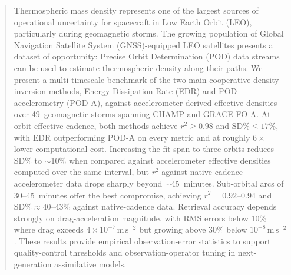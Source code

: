 \documentclass[draft]{agujournal2019}
\begin{document}
\begin{abstract}
Thermospheric mass density represents one of the largest sources of operational uncertainty for spacecraft in Low Earth Orbit (LEO), particularly during geomagnetic storms. The growing population of Global Navigation Satellite System (GNSS)-equipped LEO satellites presents a dataset of opportunity: Precise Orbit Determination (POD) data streams can be used to estimate thermospheric density along their paths. We present a multi-timescale benchmark of the two main cooperative density inversion methods, Energy Dissipation Rate (EDR) and POD-accelerometry (POD-A), against accelerometer-derived effective densities over 49~geomagnetic storms spanning CHAMP and GRACE-FO-A. At orbit-effective cadence, both methods achieve $r^{2} \geq 0.98$ and $\text{SD\%} \leq 17\%$, with EDR outperforming POD-A on every metric and at roughly $6\times$ lower computational cost. Increasing the fit-span to three orbits reduces $\text{SD\%}$ to $\sim$10\% when compared against accelerometer effective densities computed over the same interval, but $r^{2}$ against native-cadence accelerometer data drops sharply beyond $\sim$45~minutes. Sub-orbital arcs of 30--45~minutes offer the best compromise, achieving $r^{2} = 0.92$--$0.94$ and $\text{SD\%} \approx 40$--$43\%$ against native-cadence data. Retrieval accuracy depends strongly on drag-acceleration magnitude, with RMS errors below 10\% where drag exceeds $4 \times 10^{-7}\,\mathrm{m\,s^{-2}}$ but growing above 30\% below $10^{-8}\,\mathrm{m\,s^{-2}}$. These results provide empirical observation-error statistics to support quality-control thresholds and observation-operator tuning in next-generation assimilative models.
\end{abstract}
\end{document}
